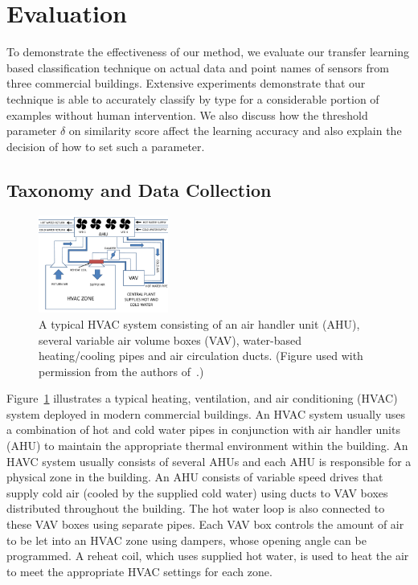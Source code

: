 \section{Evaluation}
To demonstrate the effectiveness of our method, we evaluate our transfer learning based classification technique on actual data and point names of sensors from three commercial buildings. Extensive experiments demonstrate that our technique is able to accurately classify by type for a considerable portion of examples without human intervention. We also discuss how the threshold parameter $\delta$ on similarity score affect the learning accuracy and also explain the decision of how to set such a parameter.

\subsection{Taxonomy and Data Collection}
\begin{figure}[t]
\centering
\includegraphics[width=0.38\textwidth]{./fig/hvac}
\caption{A typical HVAC system consisting of an air handler unit (AHU), several variable air volume boxes (VAV), water-based heating/cooling pipes and air circulation ducts. (Figure used with permission from the authors of~\cite{sentinel}.)}
\label{fig:hvac}
\end{figure}

Figure~\ref{fig:hvac} illustrates a typical heating, ventilation, and air conditioning (HVAC) system deployed in modern commercial buildings. 
An HVAC system usually uses a combination of hot and cold water pipes in conjunction with
air handler units (AHU) to maintain the appropriate thermal environment within the building.
An HAVC system usually consists of several AHUs and each AHU is responsible for a physical zone
in the building. An AHU consists of variable speed drives that supply cold air
(cooled by the supplied cold water) using ducts to VAV boxes distributed throughout the building.
The hot water loop is also connected to these VAV boxes using separate pipes. Each VAV box
controls the amount of air to be let into an HVAC zone using dampers, whose opening angle
can be programmed. A reheat coil, which uses supplied hot water, is used to heat the air to
meet the appropriate HVAC settings for each zone.

